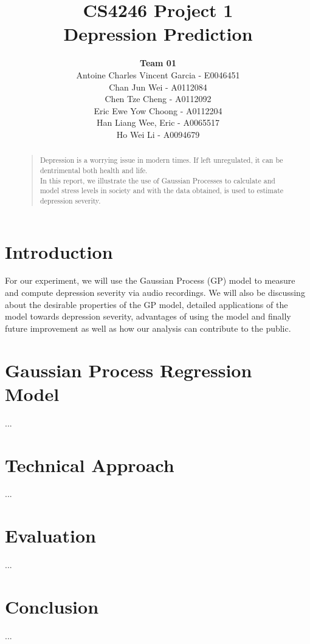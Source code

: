 \documentclass{article}
\title{
	CS4246 Project 1\\ Depression Prediction
}
\author{
	{\bf Team 01} \\
	Antoine Charles Vincent Garcia - E0046451\\	
	Chan Jun Wei - A0112084\\
	Chen Tze Cheng - A0112092\\
	Eric Ewe Yow Choong - A0112204\\
	Han Liang Wee, Eric - A0065517\\
	Ho Wei Li - A0094679\\
}
\begin{document}
 	\maketitle

	\begin{abstract}
	\begin{quote}
	Depression is a worrying issue in modern times. If left unregulated, it can be dentrimental both health and life. \\
	
	In this report, we illustrate the use of Gaussian Processes to calculate and model stress levels in society and with the data obtained, is used to estimate depression severity.
	\end{quote}
	\end{abstract}
	
	\section{Introduction}
	For our experiment, we will use the Gaussian Process (GP) model to measure and compute depression severity via audio recordings. We will also be discussing about the desirable properties of the GP model, detailed applications of the model towards depression severity, advantages of using the model and finally future improvement as well as how our analysis can contribute to the public. \\

	\section{Gaussian Process Regression Model}
	... \\

	\section{Technical Approach}
	... \\	

	\section{Evaluation}
	... \\

	\section{Conclusion}	
	... \\
\end{document}
